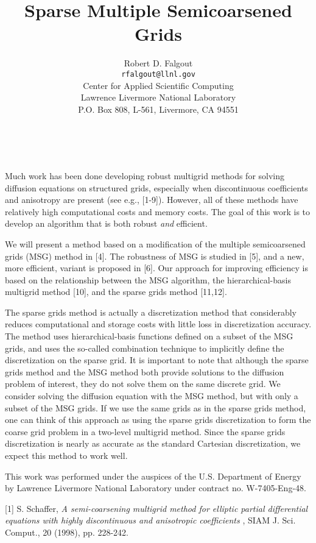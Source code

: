 \documentclass[11pt]{article}
\date{ ~ \hspace{-4mm}}
\title{Sparse Multiple Semicoarsened Grids  }
\author{Robert D. Falgout \\ {\tt  rfalgout@llnl.gov} \\ Center for Applied Scientific Computing  \\  Lawrence Livermore National Laboratory  \\  P.O. Box 808, L-561, Livermore, CA  94551}
\begin{document}
\maketitle
\thispagestyle{empty}





Much work has been done developing robust multigrid methods for
solving diffusion equations on structured grids, especially when
discontinuous coefficients and anisotropy are present (see e.g.,
[1-9]).  However, all of these methods have relatively high
computational costs and memory costs.  The goal of this work is to
develop an algorithm that is both robust
{\em 
and
}
efficient.




We will present a method based on a modification of the multiple
semicoarsened grids (MSG) method in [4].  The robustness of MSG is
studied in [5], and a new, more efficient, variant is proposed in [6].
Our approach for improving efficiency is based on the relationship
between the MSG algorithm, the hierarchical-basis multigrid method
[10], and the sparse grids method [11,12].




The sparse grids method is actually a discretization method that
considerably reduces computational and storage costs with little loss
in discretization accuracy.  The method uses hierarchical-basis
functions defined on a subset of the MSG grids, and uses the so-called
combination technique to implicitly define the discretization on the
sparse grid.  It is important to note that although the sparse grids
method and the MSG method both provide solutions to the diffusion
problem of interest, they do not solve them on the same discrete grid.
We consider solving the diffusion equation with the MSG method, but
with only a subset of the MSG grids.  If we use the same grids as in
the sparse grids method, one can think of this approach as using the
sparse grids discretization to form the coarse grid problem in a
two-level multigrid method.  Since the sparse grids discretization is
nearly as accurate as the standard Cartesian discretization, we expect
this method to work well.




This work was performed under the auspices of the U.S. Department of
Energy by Lawrence Livermore National Laboratory under contract
no. W-7405-Eng-48.


[1] S. Schaffer,
{\em 
A semi-coarsening multigrid method for elliptic
partial differential equations with highly discontinuous and
anisotropic coefficients
}
, SIAM J. Sci. Comput., 20 (1998),
pp. 228-242.
\end{document}
